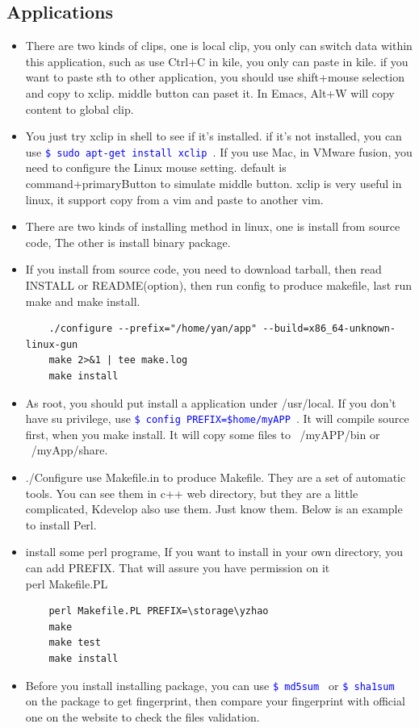 \documentclass[a4paper,12pt,twoside]{book}
\newcommand{\linuxcommand}[1]{\texttt{\textcolor{blue}{\$ #1 \Pisymbol{psy}{191}}}}
\begin{document}
\subsection{Applications}
	\begin{itemize}
	\item There are two kinds of clips, one is local clip, you only can switch data within this application, such as use Ctrl+C in kile, you only can paste in kile. if you want to paste sth to other application, you should use shift+mouse selection and copy to xclip. middle button can paset it. In Emacs, Alt+W will copy content to global clip.
	\item You just try xclip in shell to see if it's installed. if it's not installed, you can use \linuxcommand{sudo apt-get install xclip}. If you use Mac, in VMware fusion, you need to configure the Linux mouse setting.  default is command+primaryButton to simulate middle button.  xclip is very useful in linux, it support copy from a vim and paste to another vim.  
	\item There are two kinds of installing method in linux, one is install from source code, The other is install binary package.
    \item If you install from source code, you need to download tarball, then read
        INSTALL or README(option), then run config to produce makefile, last run make
        and make install.
         \begin{verbatim}
	./configure --prefix="/home/yan/app" --build=x86_64-unknown-linux-gun 
	make 2>&1 | tee make.log
	make install 
    \end{verbatim}
     \item As root, you should put install a application under /usr/local. If you don't have
         su privilege, use \linuxcommand{config PREFIX=\$home/myAPP}.  It will compile
         source first, when you make install. It will copy some files to ~/myAPP/bin or
         ~/myApp/share.
     \item./Configure use Makefile.in to produce Makefile. They are a set of automatic
         tools. You can see them in c++ web directory, but they are a little complicated,
         Kdevelop also use them.  Just know them.  Below is an example to install Perl.
	 \item install some perl programe, If you want to install in your own directory, you can add PREFIX. That will assure you have permission on it \\
  	 perl Makefile.PL
    \begin{verbatim}
    perl Makefile.PL PREFIX=\storage\yzhao
    make
    make test
    make install
    \end{verbatim}
	\item Before you install installing package, you can use \linuxcommand{md5sum} or \linuxcommand{sha1sum} on the package to get fingerprint, then compare your fingerprint with official one on the
website to check the files validation.


\end{itemize}
\end{document}
